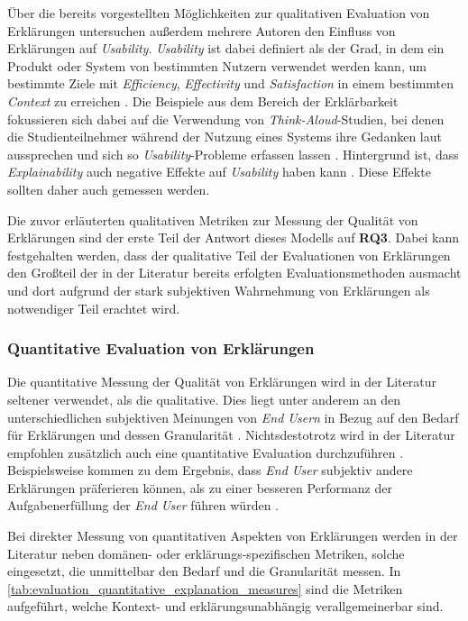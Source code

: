 Über die bereits vorgestellten Möglichkeiten zur qualitativen Evaluation von Erklärungen untersuchen außerdem mehrere Autoren den Einfluss von Erklärungen auf \textit{Usability}. \textit{Usability} ist dabei definiert als der \glqq Grad, in dem ein Produkt oder System von bestimmten Nutzern verwendet werden kann, um bestimmte Ziele mit \textit{Efficiency}, \textit{Effectivity} und \textit{Satisfaction} in einem bestimmten \textit{Context} zu erreichen \grqq{} \cite[übersetzt vgl.][]{international2011iso}. Die Beispiele aus dem Bereich der Erklärbarkeit fokussieren sich dabei auf die Verwendung von \textit{Think-Aloud}-Studien, bei denen die Studienteilnehmer während der Nutzung eines Systems ihre Gedanken laut aussprechen und sich so \textit{Usability}-Probleme erfassen lassen \cite{wiegand_id_2020, yamada_evaluating_2016}. Hintergrund ist, dass \textit{Explainability} auch negative Effekte auf \textit{Usability} haben kann \cite{chazette_knowledge_nodate}. Diese Effekte sollten daher auch gemessen werden.

\bigskip

Die zuvor erläuterten qualitativen Metriken zur Messung der Qualität von Erklärungen sind der erste Teil der Antwort dieses Modells auf \textbf{RQ3}. Dabei kann festgehalten werden, dass der qualitative Teil der Evaluationen von Erklärungen den Großteil der in der Literatur bereits erfolgten Evaluationsmethoden ausmacht und dort aufgrund der stark subjektiven Wahrnehmung von Erklärungen als notwendiger Teil erachtet wird.

\subsubsection{Quantitative Evaluation von Erklärungen}

Die quantitative Messung der Qualität von Erklärungen wird in der Literatur seltener verwendet, als die qualitative. Dies liegt unter anderem an den unterschiedlichen subjektiven Meinungen von \textit{End Usern} in Bezug auf den Bedarf für Erklärungen und dessen Granularität \cite{chazette_end-users_nodate, kouki_user_2017}. Nichtsdestotrotz wird in der Literatur empfohlen zusätzlich auch eine quantitative Evaluation durchzuführen \cite{balog_measuring_2020}. Beispielsweise kommen \citeauthor{wiegand2019drive} zu dem Ergebnis, dass \textit{End User} subjektiv andere Erklärungen präferieren können, als zu einer besseren Performanz der Aufgabenerfüllung der \textit{End User} führen würden \cite{wiegand2019drive}.

Bei direkter Messung von quantitativen Aspekten von Erklärungen werden in der Literatur neben domänen- oder erklärungs-spezifischen Metriken, solche eingesetzt, die unmittelbar den Bedarf und die Granularität messen. In \autoref{tab:evaluation_quantitative_explanation_measures} sind die Metriken aufgeführt, welche Kontext- und erklärungsunabhängig verallgemeinerbar sind.

